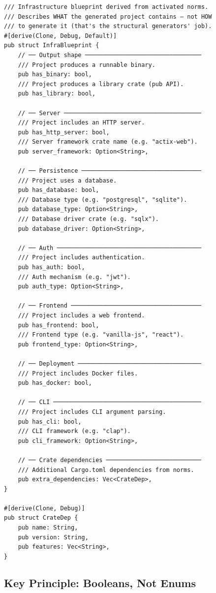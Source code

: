 \documentclass[11pt,a4paper]{article}
\begin{document}
\begin{lstlisting}[style=rust]
/// Infrastructure blueprint derived from activated norms.
/// Describes WHAT the generated project contains — not HOW 
/// to generate it (that's the structural generators' job).
#[derive(Clone, Debug, Default)]
pub struct InfraBlueprint {
    // ── Output shape ─────────────────────────────────
    /// Project produces a runnable binary.
    pub has_binary: bool,
    /// Project produces a library crate (pub API).
    pub has_library: bool,
    
    // ── Server ───────────────────────────────────────
    /// Project includes an HTTP server.
    pub has_http_server: bool,
    /// Server framework crate name (e.g. "actix-web").
    pub server_framework: Option<String>,
    
    // ── Persistence ──────────────────────────────────
    /// Project uses a database.
    pub has_database: bool,
    /// Database type (e.g. "postgresql", "sqlite").
    pub database_type: Option<String>,
    /// Database driver crate (e.g. "sqlx").
    pub database_driver: Option<String>,
    
    // ── Auth ─────────────────────────────────────────
    /// Project includes authentication.
    pub has_auth: bool,
    /// Auth mechanism (e.g. "jwt").
    pub auth_type: Option<String>,
    
    // ── Frontend ─────────────────────────────────────
    /// Project includes a web frontend.
    pub has_frontend: bool,
    /// Frontend type (e.g. "vanilla-js", "react").
    pub frontend_type: Option<String>,
    
    // ── Deployment ───────────────────────────────────
    /// Project includes Docker files.
    pub has_docker: bool,
    
    // ── CLI ──────────────────────────────────────────
    /// Project includes CLI argument parsing.
    pub has_cli: bool,
    /// CLI framework (e.g. "clap").
    pub cli_framework: Option<String>,
    
    // ── Crate dependencies ───────────────────────────
    /// Additional Cargo.toml dependencies from norms.
    pub extra_dependencies: Vec<CrateDep>,
}

#[derive(Clone, Debug)]
pub struct CrateDep {
    pub name: String,
    pub version: String,
    pub features: Vec<String>,
}
\end{lstlisting}

\subsection{Key Principle: Booleans, Not Enums}
\end{document}
